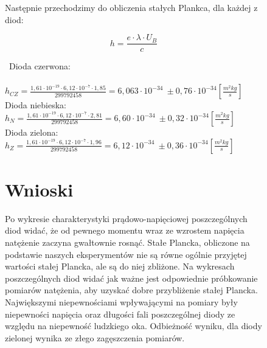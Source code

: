 \documentclass{article}
\begin{document}
\begin{figure}[h!]
    \begin{center}
        Następnie przechodzimy do obliczenia stałych Plankca, dla każdej z diod:
    \end{center}{}
    $$
    h=\frac{e\cdot \lambda \cdot U_{B}}{c}
    $$
    

    \par \ Dioda czerwona:\\ \\
    \vspace{1ex}
    $h_{CZ}=\frac{1,61\cdot 10^{−19}\cdot 6,12\cdot10^{-7} \cdot1,85}{299792458}=6,063\cdot10^{-34} \ \pm0,76\cdot10^{-34} \left[\frac{m^2kg}{s}\right]$\\
    \vspace{2.5ex}
    Dioda niebieska:\\
    \vspace{2ex}
    $h_{N}=\frac{1,61\cdot 10^{−19}\cdot 6,12\cdot10^{-7} \cdot2,81}{299792458}=6,60\cdot10^{-34} \ \pm0,32\cdot10^{-34} \left[\frac{m^2kg}{s}\right]$\\
    \vspace{2ex}
    Dioda zielona:\\
    \vspace{2ex}
    $h_{Z}=\frac{1,61\cdot 10^{−19}\cdot 6,12\cdot10^{-7} \cdot1,96}{299792458}=6,12\cdot10^{-34} \ \pm0,36\cdot10^{-34} \left[\frac{m^2kg}{s}\right]$\\
        
\end{figure}




\begin{figure}[h!]
\section{Wnioski}
\par Po wykresie charakterystyki prądowo-napięciowej poszczególnych diod widać, że od pewnego momentu wraz ze wzrostem napięcia natężenie zaczyna gwałtownie rosnąć. Stałe Plancka, obliczone na podstawie naszych eksperymentów nie są równe ogólnie przyjętej wartości stałej Plancka, ale są do niej zbliżone. Na wykresach poszczególnych diod widać jak ważne jest odpowiednie próbkowanie pomiarów natężenia, aby uzyskać dobre przybliżenie stałej Plancka. Największymi niepewnościami wpływającymi na pomiary były niepewności napięcia oraz długości fali poszczególnej diody ze względu na niepewność ludzkiego oka. Odbieżność wyniku, dla diody zielonej wynika ze złego zagęszczenia pomiarów.
\end{figure}
\end{document}
